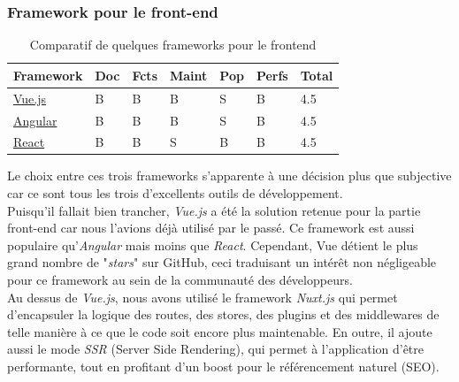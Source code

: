\subsubsection*{Framework pour le front-end}
\begin{table}[H]
    \centering
    \begin{tabular}{| l | l | l | l | l | l | l |}
    \hline
        Framework & Doc & Fcts & Maint & Pop & Perfs & Total \\
    \hline
        \href{https://vuejs.org}{Vue.js} &
        B &  
        B &
        B &            
        S &              
        B &
        4.5 \\
    \hline
        \href{https://angular.io}{Angular} &
        B &                
        B &   
        B &
        S &              
        B &       
        4.5 \\
    \hline
        \href{https://fr.reactjs.org}{React} &
        B &                
        B &     
        S &
        B &              
        B &       
        4.5 \\  
    \hline
    \end{tabular}
    \caption{Comparatif de quelques frameworks pour le \Gls{frontend}}
    \label{table:compFrameworksFrontend}
\end{table}

Le choix entre ces trois frameworks s'apparente à une décision plus que subjective car ce sont tous les trois d'excellents outils de développement. \\

Puisqu'il fallait bien trancher, \textit{Vue.js} a été la solution retenue pour la partie front-end car nous l'avions déjà utilisé par le passé. Ce framework est aussi populaire qu'\textit{Angular} mais moins que \textit{React}. Cependant, Vue détient le plus grand nombre de "\textit{stars}" sur GitHub, ceci traduisant un intérêt non négligeable pour ce framework au sein de la communauté des développeurs.\\

Au dessus de \textit{Vue.js}, nous avons utilisé le framework \textit{Nuxt.js} qui permet d'encapsuler la logique des routes, des stores, des plugins et des middlewares de telle manière à ce que le code soit encore plus maintenable. En outre, il ajoute aussi le mode \textit{SSR} (Server Side Rendering), qui permet à l'application d'être performante, tout en profitant d'un boost pour le référencement naturel (SEO).

